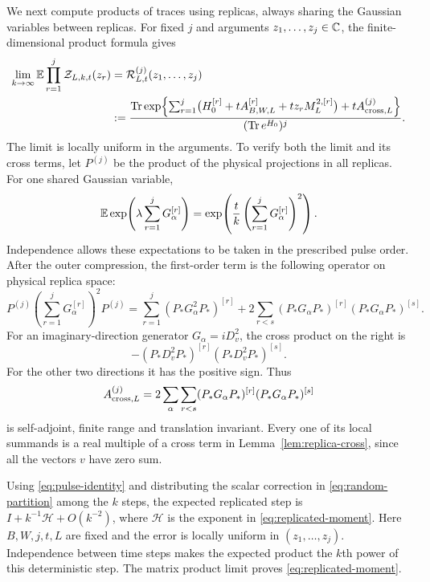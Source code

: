We next compute products of traces using replicas, always sharing the
Gaussian variables between replicas.  For fixed $j$ and arguments
$z_1,\ldots,z_j\in\mathbb C$, the finite-dimensional product formula gives
\begin{equation}
 \begin{split}
 \lim_{k\to\infty}\mathbb E\prod_{r=1}^j\mathcal Z_{L,k,t}(z_r)
  &=\mathcal R^{(j)}_{L,t}(z_1,\ldots,z_j)\\
  &:=\frac{\operatorname{Tr}\exp\!\left\{
        \sum_{r=1}^j\bigl(H_0^{[r]}+tA_{B,W,L}^{[r]}
                                      +tz_rM_L^{2,[r]}\bigr)
                         +tA_{{\rm cross},L}^{(j)}\right\}}
                       {(\operatorname{Tr} e^{H_0})^j}.
 \end{split}
 \label{eq:replicated-moment}
\end{equation}
The limit is locally uniform in the arguments.  To verify both the
limit and its cross terms, let $P^{(j)}$ be the product of the physical
projections in all replicas.  For one shared Gaussian variable,
\[
 \mathbb E\exp\!\left(\lambda\sum_{r=1}^jG_\alpha^{[r]}\right)
       =\exp\!\left(\frac tk
                          \left(\sum_{r=1}^jG_\alpha^{[r]}\right)^2\right).
\]
Independence allows these expectations to be taken in the prescribed
pulse order.  After the outer compression, the first-order term is
the following operator on physical replica space:
\begin{equation}
 P^{(j)}\left(\sum_{r=1}^jG_\alpha^{[r]}\right)^2P^{(j)}
   =\sum_{r=1}^j(P_*G_\alpha^2P_*)^{[r]}
       +2\sum_{r<s}(P_*G_\alpha P_*)^{[r]}
                         (P_*G_\alpha P_*)^{[s]}.
 \label{eq:compression-replicas}
\end{equation}
For an imaginary-direction generator $G_\alpha=iD_v^2$, the cross
product on the right is
\[
 -(P_*D_v^2P_*)^{[r]}(P_*D_v^2P_*)^{[s]}.
\]
For the other two directions
it has the positive sign.  Thus
\[
 A_{{\rm cross},L}^{(j)}
   =2\sum_\alpha\sum_{r<s}(P_*G_\alpha P_*)^{[r]}
                                      (P_*G_\alpha P_*)^{[s]}
\]
is self-adjoint, finite range and translation invariant.  Every one of
its local summands is a real multiple of a cross term in
Lemma~\ref{lem:replica-cross}, since all the vectors $v$ have zero sum.

Using \eqref{eq:pulse-identity} and distributing the scalar correction
in \eqref{eq:random-partition} among the $k$ steps, the expected
replicated step is $I+k^{-1}\mathcal H+O(k^{-2})$, where $\mathcal H$
is the exponent in \eqref{eq:replicated-moment}.  Here $B,W,j,t,L$ are
fixed and the error is locally uniform in $(z_1,\ldots,z_j)$.
Independence between time steps makes the expected product the $k$th
power of this deterministic step.  The matrix product limit
\cite{Trotter1959} proves \eqref{eq:replicated-moment}.

